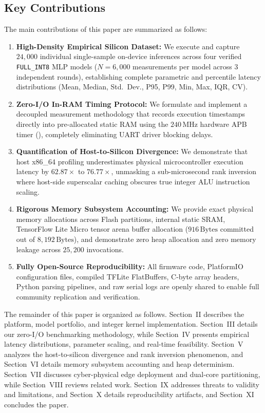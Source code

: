 \documentclass[journal,10pt]{IEEEtran}
\begin{document}
\subsection{Key Contributions}
The main contributions of this paper are summarized as follows:
\begin{enumerate}
    \item \textbf{High-Density Empirical Silicon Dataset:} We execute and capture $24,000$ individual single-sample on-device inferences across four verified \texttt{FULL\_INT8} MLP models ($N=6,000$ measurements per model across 3 independent rounds), establishing complete parametric and percentile latency distributions (Mean, Median, Std.~Dev., P95, P99, Min, Max, IQR, CV).
    \item \textbf{Zero-I/O In-RAM Timing Protocol:} We formulate and implement a decoupled measurement methodology that records execution timestamps directly into pre-allocated static RAM using the $240\,\text{MHz}$ hardware APB timer (), completely eliminating UART driver blocking delays.
    \item \textbf{Quantification of Host-to-Silicon Divergence:} We demonstrate that host x86\_64 profiling underestimates physical microcontroller execution latency by $62.87\times$ to $76.77\times$, unmasking a sub-microsecond rank inversion where host-side superscalar caching obscures true integer ALU instruction scaling.
    \item \textbf{Rigorous Memory Subsystem Accounting:} We provide exact physical memory allocations across Flash partitions, internal static SRAM, TensorFlow Lite Micro tensor arena buffer allocation ($916\,\text{Bytes}$ committed out of $8,192\,\text{Bytes}$), and demonstrate zero heap allocation and zero memory leakage across $25,200$ invocations.
    \item \textbf{Fully Open-Source Reproducibility:} All firmware code, PlatformIO configuration files, compiled TFLite FlatBuffers, C-byte array headers, Python parsing pipelines, and raw serial logs are openly shared to enable full community replication and verification.
\end{enumerate}

The remainder of this paper is organized as follows. Section~II describes the platform, model portfolio, and integer kernel implementation. Section~III details our zero-I/O benchmarking methodology, while Section~IV presents empirical latency distributions, parameter scaling, and real-time feasibility. Section~V analyzes the host-to-silicon divergence and rank inversion phenomenon, and Section~VI details memory subsystem accounting and heap determinism. Section~VII discusses cyber-physical edge deployment and dual-core partitioning, while Section~VIII reviews related work. Section~IX addresses threats to validity and limitations, and Section~X details reproducibility artifacts, and Section~XI concludes the paper.
\end{document}
